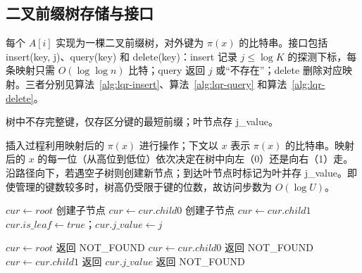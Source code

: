 \subsection{二叉前缀树存储与接口}

每个 \(A[i]\) 实现为一棵二叉前缀树，对外键为 \(\pi(x)\) 的比特串。接口包括 insert(key, j)、query(key) 和 delete(key)：insert 记录 \(j\le\log K\) 的探测下标，每条映射只需 \(O(\log\log n)\) 比特；query 返回 \(j\) 或“不存在”；delete 删除对应映射。三者分别见算法~\ref{alg:lqr-insert}、算法~\ref{alg:lqr-query} 和算法~\ref{alg:lqr-delete}。

树中不存完整键，仅存区分键的最短前缀；叶节点存 j\_value。

插入过程利用映射后的 \(\pi(x)\) 进行操作；下文以 \(x\) 表示 \(\pi(x)\) 的比特串。映射后的 \(x\) 的每一位（从高位到低位）依次决定在树中向左（0）还是向右（1）走。沿路径向下，若遇空子树则创建新节点；到达叶节点时标记为叶并存 j\_value。即使管理的键数较多时，树高仍受限于键的位数，故访问步数为 \(O(\log U)\)。

\begin{algorithm}[htbp]
  \caption{local query router.insert}
  \label{alg:lqr-insert}
  \begin{algorithmic}[1]
      \State $\mathit{cur}\gets\mathit{root}$
           创建子节点 \EndIf
          \State $\mathit{cur}\gets\mathit{cur.child0}$
        \Else
           创建子节点 \EndIf
          \State $\mathit{cur}\gets\mathit{cur.child1}$
        \EndIf
      \EndFor
      \State $\mathit{cur.is\_leaf}\gets\mathit{true}$；$\mathit{cur.j\_value}\gets j$
    \EndFunction
  \end{algorithmic}
\end{algorithm}

\begin{algorithm}[htbp]
  \caption{local query router.query}
  \label{alg:lqr-query}
  \begin{algorithmic}[1]
      \State $\mathit{cur}\gets\mathit{root}$
           返回 NOT\_FOUND \EndIf
          \State $\mathit{cur}\gets\mathit{cur.child0}$
        \Else
           返回 NOT\_FOUND \EndIf
          \State $\mathit{cur}\gets\mathit{cur.child1}$
        \EndIf
      \EndFor
       返回 $\mathit{cur.j\_value}$
      \Else  返回 NOT\_FOUND
      \EndIf
    \EndFunction
  \end{algorithmic}
\end{algorithm}

